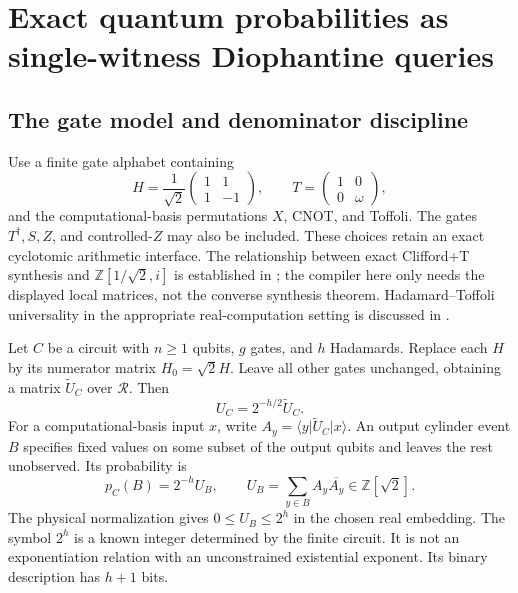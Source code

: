 \documentclass[11pt,letterpaper]{article}
\numberwithin{equation}{section}
\theoremstyle{definition}
\theoremstyle{remark}
\newcommand{\Z}{\mathbb Z}
\newcommand{\srcmark}[1]{\par\noindent{\small\itshape [source~#1]}\par}
\newcommand{\calR}{\mathcal R}
\newcommand{\ket}[1]{\lvert #1\rangle}
\newcommand{\bra}[1]{\langle #1\rvert}
\begin{document}
\section{Exact quantum probabilities as single-witness Diophantine queries}
\label{pqc:cc:sec:quantum}
\srcmark{10}

\subsection{The gate model and denominator discipline}

Use a finite gate alphabet containing
\[
 H=\frac1{\sqrt2}\begin{pmatrix}1&1\\1&-1\end{pmatrix},\qquad
 T=\begin{pmatrix}1&0\\0&\omega\end{pmatrix},
\]
and the computational-basis permutations $X$, CNOT, and Toffoli. The gates
$T^\dagger,S,Z$, and controlled-$Z$ may also be included. These choices retain
an exact cyclotomic arithmetic interface. The relationship between exact
Clifford+T synthesis and $\Z[1/\sqrt2,i]$ is established in
\cite{giles-selinger}; the compiler here only needs the displayed local matrices,
not the converse synthesis theorem. Hadamard--Toffoli universality in the
appropriate real-computation setting is discussed in \cite{b62s10-Shi}.

Let $C$ be a circuit with $n\ge1$ qubits, $g$ gates, and $h$ Hadamards.
Replace each $H$ by its numerator matrix $H_0=\sqrt2 H$. Leave all other gates
unchanged, obtaining a matrix $\widetilde U_C$ over $\calR$. Then
\begin{equation}
 U_C=2^{-h/2}\widetilde U_C.
\label{pqc:cc:eq:denominator}
\end{equation}
For a computational-basis input $x$, write
$A_y=\bra y\widetilde U_C\ket x$. An output cylinder event $B$ specifies fixed
values on some subset of the output qubits and leaves the rest unobserved.
Its probability is
\begin{equation}
 p_C(B)=2^{-h}U_B,\qquad
 U_B=\sum_{y\in B}A_y\overline{A_y}\in\Z[\sqrt2].
\label{pqc:cc:eq:probability}
\end{equation}
The physical normalization gives $0\le U_B\le2^h$ in the chosen real embedding.
The symbol $2^h$ is a known integer determined by the finite circuit. It is not
an exponentiation relation with an unconstrained existential exponent.
Its binary description has $h+1$ bits.
\end{document}
